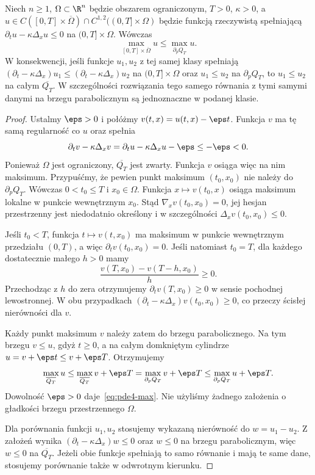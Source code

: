 \begin{twierdzenie}
\label{thm:pde4-max}
Niech $n\geq1$, $\Omega\subset\R^n$ będzie obszarem
ograniczonym, $T>0$, $\kappa>0$, a
$u\in C([0,T]\times\overline\Omega)\cap
C^{1,2}((0,T]\times\Omega)$ będzie funkcją rzeczywistą
spełniającą
$\partial_tu-\kappa\Delta_xu\leq0$
na $(0,T]\times\Omega$.
Wówczas
\begin{equation}\label{eq:pde4-max}
 \max_{[0,T]\times\overline\Omega}u
 \leq \max_{\partial_pQ_T}u.
\end{equation}
W konsekwencji, jeśli funkcje $u_1,u_2$ z tej samej
klasy spełniają
$(\partial_t-\kappa\Delta_x)u_1
\leq(\partial_t-\kappa\Delta_x)u_2$
na $(0,T]\times\Omega$ oraz $u_1\leq u_2$
na $\partial_pQ_T$, to $u_1\leq u_2$
na całym $\overline{Q_T}$.
W szczególności rozwiązania tego samego równania
z tymi samymi danymi na brzegu parabolicznym
są jednoznaczne w podanej klasie.
\end{twierdzenie}
\begin{proof}
Ustalmy $\eps>0$ i połóżmy $v(t,x)=u(t,x)-\eps t$.
Funkcja $v$ ma tę samą regularność co $u$ oraz spełnia
\[
 \partial_tv-\kappa\Delta_xv
 =\partial_tu-\kappa\Delta_xu-\eps\leq-\eps<0.
\]
Ponieważ $\Omega$ jest ograniczony,
$\overline{Q_T}$ jest zwarty. Funkcja $v$ osiąga
więc na nim maksimum. Przypuśćmy, że pewien
punkt maksimum $(t_0,x_0)$ nie należy do
$\partial_pQ_T$. Wówczas $0<t_0\leq T$ i $x_0\in\Omega$.
Funkcja $x\mapsto v(t_0,x)$ osiąga maksimum
lokalne w punkcie wewnętrznym $x_0$. Stąd
$\nabla_xv(t_0,x_0)=0$, jej hesjan przestrzenny
jest niedodatnio określony i w szczególności
$\Delta_xv(t_0,x_0)\leq0$.

Jeśli $t_0<T$, funkcja $t\mapsto v(t,x_0)$
ma maksimum w punkcie wewnętrznym przedziału
$(0,T)$, a więc $\partial_tv(t_0,x_0)=0$.
Jeśli natomiast $t_0=T$, dla każdego dostatecznie
małego $h>0$ mamy
\[
 \frac{v(T,x_0)-v(T-h,x_0)}{h}\geq0.
\]
Przechodząc z $h$ do zera otrzymujemy
$\partial_tv(T,x_0)\geq0$ w sensie pochodnej
lewostronnej. W obu przypadkach
$(\partial_t-\kappa\Delta_x)v(t_0,x_0)\geq0$,
co przeczy ścisłej nierówności dla $v$.

Każdy punkt maksimum $v$ należy zatem do brzegu
parabolicznego. Na tym brzegu $v\leq u$, gdyż
$t\geq0$, a na całym domkniętym cylindrze
$u=v+\eps t\leq v+\eps T$. Otrzymujemy
\[
 \max_{\overline{Q_T}}u
 \leq\max_{\overline{Q_T}}v+\eps T
 =\max_{\partial_pQ_T}v+\eps T
 \leq\max_{\partial_pQ_T}u+\eps T.
\]
Dowolność $\eps>0$ daje~\eqref{eq:pde4-max}.
Nie użyliśmy żadnego założenia o gładkości
brzegu przestrzennego $\Omega$.

Dla porównania funkcji $u_1,u_2$ stosujemy
wykazaną nierówność do $w=u_1-u_2$.
Z założeń wynika
$(\partial_t-\kappa\Delta_x)w\leq0$
oraz $w\leq0$ na brzegu parabolicznym, więc $w\leq0$
na $\overline{Q_T}$. Jeżeli obie funkcje spełniają
to samo równanie i mają te same dane, stosujemy
porównanie także w odwrotnym kierunku.
\end{proof}

